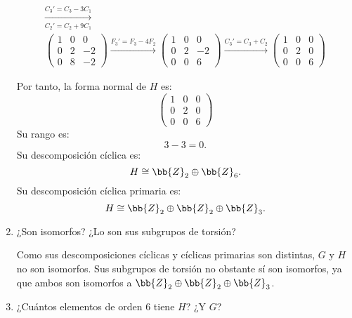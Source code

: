 \begin{ejercicio}
\begin{enumerate}
\begin{multline*}
            \xrightarrow[C_2'=C_2+9C_1]{C_3'=C_3-3C_1}\\
            \begin{pmatrix}
                1 & 0 & 0 \\
                0 & 2 & -2 \\
                0 & 8 & -2
            \end{pmatrix}
            \xrightarrow{F_3'=F_3-4F_2}
            \begin{pmatrix}
                1 & 0 & 0 \\
                0 & 2 & -2 \\
                0 & 0 & 6
            \end{pmatrix}
            \xrightarrow{C_3'=C_3+C_2}
            \begin{pmatrix}
                1 & 0 & 0 \\
                0 & 2 & 0 \\
                0 & 0 & 6
            \end{pmatrix}
        \end{multline*}

        Por tanto, la forma normal de $H$ es:
        \begin{equation*}
            \begin{pmatrix}
                1 & 0 & 0 \\
                0 & 2 & 0 \\
                0 & 0 & 6
            \end{pmatrix}
        \end{equation*}
        Su rango es:
        \begin{equation*}
            3-3= 0.
        \end{equation*}
        Su descomposición cíclica es:
        \begin{equation*}
            H \cong \bb{Z}_2 \oplus \bb{Z}_6.
        \end{equation*}
        Su descomposición cíclica primaria es:
        \begin{equation*}
            H \cong \bb{Z}_2 \oplus \bb{Z}_2 \oplus \bb{Z}_3.
        \end{equation*}


        \item ¿Son isomorfos? ¿Lo son sus subgrupos de torsión?
        
        Como sus descomposiciones cíclicas y cíclicas primarias son distintas, $G$ y $H$ no son isomorfos. Sus subgrupos de torsión no obstante sí son isomorfos, ya que ambos son isomorfos a $\bb{Z}_2 \oplus \bb{Z}_2 \oplus \bb{Z}_3$.
        \item ¿Cuántos elementos de orden $6$ tiene $H$? ¿Y $G$?
        

\end{enumerate}
\end{ejercicio}
